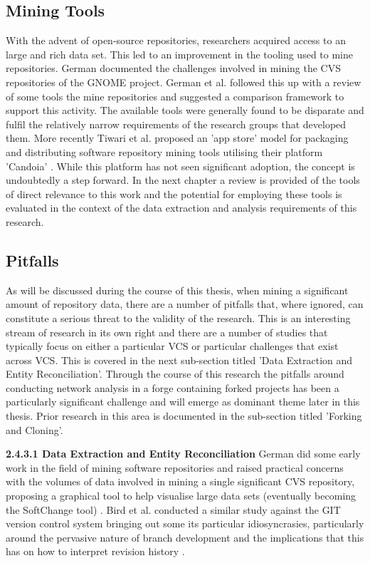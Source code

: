 \subsection{Mining Tools}
With the advent of open-source repositories, researchers acquired access to an large and rich data set. This led to an improvement in the tooling used to mine repositories. German \citep{german2004mining} documented the challenges involved in mining the CVS repositories of the GNOME project. German et al. \citep{german2005framework} followed this up with a review of some tools the mine repositories and suggested a comparison framework to support this activity. The available tools were generally found to be disparate and fulfil the relatively narrow requirements of the research groups that developed them. More recently Tiwari et al. proposed an 'app store' model for packaging and distributing software repository mining tools utilising their platform 'Candoia' \citep{tiwari2017candoia}. While this platform has not seen significant adoption, the concept is undoubtedly a step forward. In the next chapter a review is provided of the tools of direct relevance to this work and the potential for employing these tools is evaluated in the context of the data extraction and analysis requirements of this research. 

\subsection{Pitfalls}
As will be discussed during the course of this thesis, when mining a significant amount of repository data, there are a number of pitfalls that, where ignored, can constitute a serious threat to the validity of the research. This is an interesting stream of research in its own right and there are a number of studies that typically focus on either a particular VCS or particular challenges that exist across VCS. This is covered  in the next sub-section titled 'Data Extraction and Entity Reconciliation'. Through the course of this research the pitfalls around conducting network analysis in a forge containing forked projects has been a particularly significant challenge and will emerge as dominant theme later in this thesis. Prior research in this area is documented in the sub-section titled 'Forking and Cloning'.

\newline
\textbf{2.4.3.1 Data Extraction and Entity Reconciliation}
\newline
German did some early work in the field of mining software repositories and raised practical concerns with the volumes of data involved in mining a single significant CVS repository, proposing a graphical tool to help visualise large data sets (eventually becoming the SoftChange tool) \citep{german2004mining}. Bird et al. conducted a similar study against the GIT version control system bringing out some its particular idiosyncrasies, particularly around the pervasive nature of branch development and the implications that this has on how to interpret revision history \citep{bird2009promises}.

